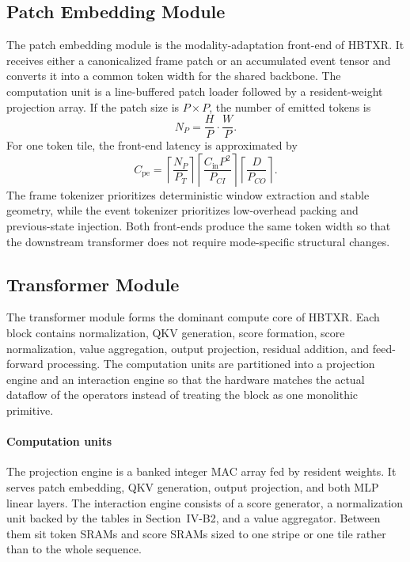 \documentclass[journal]{IEEEtran}
\begin{document}
\subsection{Patch Embedding Module}
The patch embedding module is the modality-adaptation front-end of HBTXR. It receives either a canonicalized frame patch or an accumulated event tensor and converts it into a common token width for the shared backbone. The computation unit is a line-buffered patch loader followed by a resident-weight projection array. If the patch size is $P\times P$, the number of emitted tokens is
\begin{equation}
N_P = \frac{H}{P}\cdot\frac{W}{P}.
\end{equation}
For one token tile, the front-end latency is approximated by
\begin{equation}
C_{\mathrm{pe}}=
\left\lceil\frac{N_P}{P_T}\right\rceil
\left\lceil\frac{C_{\mathrm{in}}P^2}{P_{CI}}\right\rceil
\left\lceil\frac{D}{P_{CO}}\right\rceil.
\end{equation}
The frame tokenizer prioritizes deterministic window extraction and stable geometry, while the event tokenizer prioritizes low-overhead packing and previous-state injection. Both front-ends produce the same token width so that the downstream transformer does not require mode-specific structural changes.

\subsection{Transformer Module}
The transformer module forms the dominant compute core of HBTXR. Each block contains normalization, QKV generation, score formation, score normalization, value aggregation, output projection, residual addition, and feed-forward processing. The computation units are partitioned into a projection engine and an interaction engine so that the hardware matches the actual dataflow of the operators instead of treating the block as one monolithic primitive.

\paragraph*{Computation units}
The projection engine is a banked integer MAC array fed by resident weights. It serves patch embedding, QKV generation, output projection, and both MLP linear layers. The interaction engine consists of a score generator, a normalization unit backed by the tables in Section~IV-B2, and a value aggregator. Between them sit token SRAMs and score SRAMs sized to one stripe or one tile rather than to the whole sequence.
\end{document}

